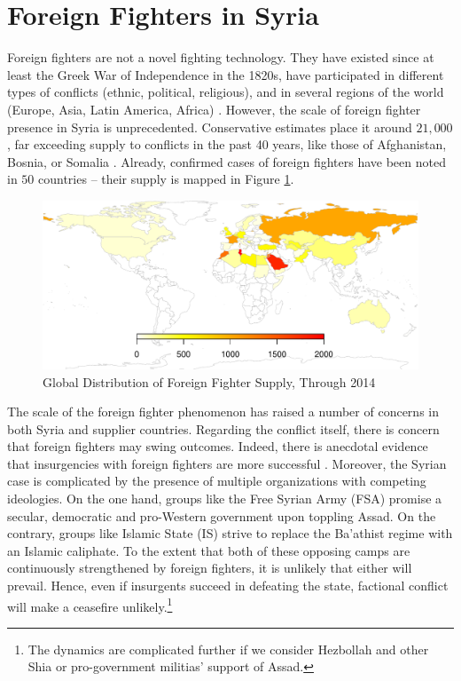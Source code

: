 \documentclass[12pt]{article}
\begin{document}
\section{Foreign Fighters in Syria}	\label{sec:background}

Foreign fighters are not a novel fighting technology. They have existed since at least the Greek War of Independence in the 1820s, have participated in different types of conflicts (ethnic, political, religious), and in several regions of the world (Europe, Asia, Latin America, Africa) \citep{Malet2010}. However, the scale of foreign fighter presence in Syria is unprecedented. Conservative estimates place it around $21,000$, far exceeding supply to conflicts in the past 40 years, like those of Afghanistan, Bosnia, or Somalia \citep{Hegghammer2011}. Already, confirmed cases of foreign fighters have been noted in $50$ countries \citep{Neumann2015} -- their supply is mapped in Figure \ref{fig:ff_map}. \\

\begin{figure}
	\centering
	\includegraphics[width = \linewidth]{tabs_figs/worldMap_edited.pdf}
	\caption{Global Distribution of Foreign Fighter Supply, Through 2014 \citep{Neumann2015}}	\label{fig:ff_map} 
\end{figure}

The scale of the foreign fighter phenomenon has raised a number of concerns in both Syria and supplier countries. Regarding the conflict itself, there is concern that foreign fighters may swing outcomes. Indeed, there is anecdotal evidence that insurgencies with foreign fighters are more successful \citep{Hegghammer2011, Malet2010}. Moreover, the Syrian case is complicated by the presence of multiple organizations with competing ideologies. On the one hand, groups like the Free Syrian Army (FSA) promise a secular, democratic and pro-Western government upon toppling Assad. On the contrary, groups like Islamic State (IS) strive to replace the Ba'athist regime with an Islamic caliphate. To the extent that both of these opposing camps are continuously strengthened by foreign fighters, it is unlikely that either will prevail. Hence, even if insurgents succeed in defeating the state, factional conflict will make a ceasefire unlikely.\footnote{The dynamics are complicated further if we consider Hezbollah and other Shia or pro-government militias' support of Assad.} 	\\
\end{document}

